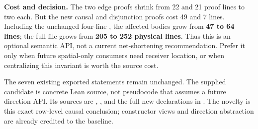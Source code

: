 \textbf{Cost and decision.} The two edge proofs shrink from 22 and 21 proof lines to two each. But the new causal and disjunction proofs cost 49 and 7 lines. Including the unchanged four-line , the affected bodies grow from \textbf{47 to 64 lines}; the full file grows from \textbf{205 to 252 physical lines}. Thus this is an optional semantic API, not a current net-shortening recommendation. Prefer it only when future spatial-only consumers need receiver location, or when centralizing this invariant is worth the source cost.

The seven existing exported statements remain unchanged. The supplied candidate is concrete Lean source, not pseudocode that assumes a future direction API. Its sources are , , and the full new declarations in . The novelty is this exact row-level causal conclusion; constructor views and direction abstraction are already credited to the baseline.

